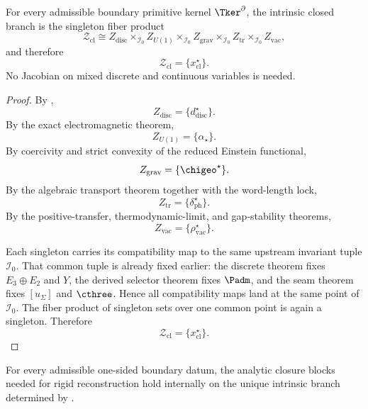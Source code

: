 \begin{theorem}
\label{thm:intrinsic-closed-branch}
\label{thm:observation-closure}
\label{thm:singleton-fiber-product-branch}
For every admissible boundary primitive kernel $\Tker^\partial$, the intrinsic closed branch is the
singleton fiber product
\[
\mathcal Z_{\mathrm{cl}}
\cong
Z_{\mathrm{disc}}
\times_{\mathcal I_0}
Z_{U(1)}
\times_{\mathcal I_0}
Z_{\mathrm{grav}}
\times_{\mathcal I_0}
Z_{\mathrm{tr}}
\times_{\mathcal I_0}
Z_{\mathrm{vac}},
\]
and therefore
\[
\mathcal Z_{\mathrm{cl}}=\{x_{\mathrm{cl}}^\star\}.
\]
No Jacobian on mixed discrete and continuous variables is needed.
\end{theorem}

\begin{proof}
By ,
\[
Z_{\mathrm{disc}}=\{d^\star_{\mathrm{disc}}\}.
\]
By the exact electromagnetic theorem,
\[
Z_{U(1)}=\{\alpha_\star\}.
\]
By coercivity and strict convexity of the reduced Einstein functional,
\[
Z_{\mathrm{grav}}=\{\chigeo^\star\}.
\]
By the algebraic transport theorem together with the word-length lock,
\[
Z_{\mathrm{tr}}=\{\delta_{\mathrm{ph}}^\star\}.
\]
By the positive-transfer, thermodynamic-limit, and gap-stability theorems,
\[
Z_{\mathrm{vac}}=\{\rho_{\mathrm{vac}}^\star\}.
\]

Each singleton carries its compatibility map to the same upstream invariant tuple $\mathcal I_0$.
That common tuple is already fixed earlier: the discrete theorem fixes $E_3\oplus E_2$ and $Y$,
the derived selector theorem fixes $\Padm$, and the seam theorem fixes $[u_\Sigma]$ and $\cthree$.
Hence all compatibility maps land at the same point of $\mathcal I_0$. The fiber product of
singleton sets over one common point is again a singleton. Therefore
\[
\mathcal Z_{\mathrm{cl}}=\{x_{\mathrm{cl}}^\star\}.
\]
\end{proof}

\begin{theorem}
\label{thm:internal-analytic-closure}
\label{thm:internal-analytic-closure-hard}
For every admissible one-sided boundary datum, the analytic closure blocks needed for rigid
reconstruction hold internally on the unique intrinsic branch determined by
.
\end{theorem}

